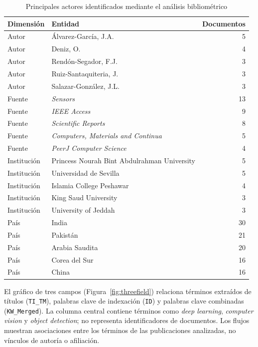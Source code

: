 \documentclass[pdflatex,sn-mathphys-num]{sn-jnl}%
\theoremstyle{thmstyleone}%
\theoremstyle{thmstyletwo}%
\theoremstyle{thmstylethree}%
\begin{document}
\begin{table}[!htbp]
\caption{Principales actores identificados mediante el análisis bibliométrico}
\label{tab:ab1_productivity}
\centering
\small
\renewcommand{\arraystretch}{1.12}
\begin{tabular}{@{}L{2.5cm}L{7.2cm}r@{}}
\toprule
\textbf{Dimensión} & \textbf{Entidad} & \textbf{Documentos} \\
\midrule
Autor & Álvarez-García, J.A. & 5 \\
Autor & Deniz, O. & 4 \\
Autor & Rendón-Segador, F.J. & 3 \\
Autor & Ruiz-Santaquiteria, J. & 3 \\
Autor & Salazar-González, J.L. & 3 \\
\midrule
Fuente & \textit{Sensors} & 13 \\
Fuente & \textit{IEEE Access} & 9 \\
Fuente & \textit{Scientific Reports} & 8 \\
Fuente & \textit{Computers, Materials and Continua} & 5 \\
Fuente & \textit{PeerJ Computer Science} & 4 \\
\midrule
Institución & Princess Nourah Bint Abdulrahman University & 5 \\
Institución & Universidad de Sevilla & 5 \\
Institución & Islamia College Peshawar & 4 \\
Institución & King Saud University & 3 \\
Institución & University of Jeddah & 3 \\
\midrule
País & India & 30 \\
País & Pakistán & 21 \\
País & Arabia Saudita & 20 \\
País & Corea del Sur & 16 \\
País & China & 16 \\
\bottomrule
\end{tabular}
\end{table}
\FloatBarrier

El gráfico de tres campos (Figura~\ref{fig:threefield}) relaciona términos extraídos de títulos (\texttt{TI\_TM}), palabras clave de indexación (\texttt{ID}) y palabras clave combinadas (\texttt{KW\_Merged}). La columna central contiene términos como \textit{deep learning}, \textit{computer vision} y \textit{object detection}; no representa identificadores de documentos. Los flujos muestran asociaciones entre los términos de las publicaciones analizadas, no vínculos de autoría o afiliación.
\end{document}
